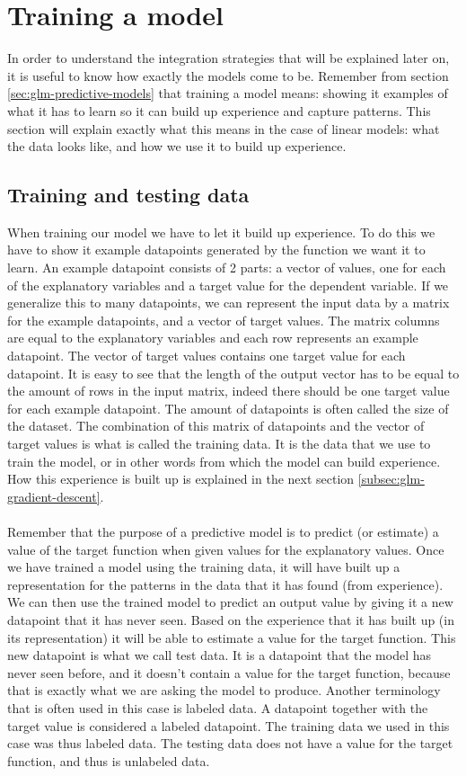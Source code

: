 \section{Training a model}
\label{sec:glm-trainingamodel}
In order to understand the integration strategies that will be explained later on, it is useful to know how exactly the models come to be. Remember from section \ref{sec:glm-predictive-models} that training a model means: showing it examples of what it has to learn so it can build up experience and capture patterns. This section will explain exactly what this means in the case of linear models: what the data looks like, and how we use it to build up experience.
\subsection{Training and testing data}
\label{subsec:glm-training-testing-data}
When training our model we have to let it build up experience. To do this we have to show it example datapoints generated by the function we want it to learn. An example datapoint consists of 2 parts: a vector of values, one for each of the explanatory variables and a target value for the dependent variable. If we generalize this to many datapoints, we can represent the input data by a matrix for the example datapoints, and a vector of target values. The matrix columns are equal to the explanatory variables and each row represents an example datapoint. The vector of target values contains one target value for each datapoint. It is easy to see that the length of the output vector has to be equal to the amount of rows in the input matrix, indeed there should be one target value for each example datapoint. The amount of datapoints is often called the size of the dataset. The combination of this matrix of datapoints and the vector of target values is what is called the training data. It is the data that we use to train the model, or in other words from which the model can build experience. How this experience is built up is explained in the next section \ref{subsec:glm-gradient-descent}. \\ \\
Remember that the purpose of a predictive model is to predict (or estimate) a value of the target function when given values for the explanatory values. Once we have trained a model using the training data, it will have built up a representation for the patterns in the data that it has found (from experience). We can then use the trained model to predict an output value by giving it a new datapoint that it has never seen. Based on the experience that it has built up (in its representation) it will be able to estimate a value for the target function. This new datapoint is what we call test data. It is a datapoint that the model has never seen before, and it doesn't contain a value for the target function, because that is exactly what we are asking the model to produce. Another terminology that is often used in this case is labeled data. A datapoint together with the target value is considered a labeled datapoint. The training data we used in this case was thus labeled data. The testing data does not have a value for the target function, and thus is unlabeled data.

